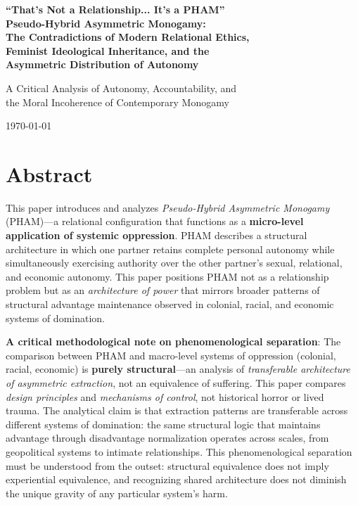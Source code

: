 \documentclass[12pt, letterpaper]{article}
\begin{document}
\begin{titlepage}
    \centering
    \vspace*{2in}
    {\LARGE\bfseries ``That's Not a Relationship... It's a PHAM''\\[0.5em]
    \large Pseudo-Hybrid Asymmetric Monogamy:\\[0.3em]
    The Contradictions of Modern Relational Ethics,\\[0.3em]
    Feminist Ideological Inheritance, and the\\[0.3em]
    Asymmetric Distribution of Autonomy\par}
    \vspace{1.5in}
    {\Large A Critical Analysis of Autonomy, Accountability, and\\[0.3em]
    the Moral Incoherence of Contemporary Monogamy\par}
    \vspace{2in}
    {\large\today\par}
    \vfill
\end{titlepage}

\newpage
\section*{Abstract}

This paper introduces and analyzes \textit{Pseudo-Hybrid Asymmetric Monogamy} (PHAM)---a relational configuration that functions as a \textbf{micro-level application of systemic oppression}. PHAM describes a structural architecture in which one partner retains complete personal autonomy while simultaneously exercising authority over the other partner's sexual, relational, and economic autonomy. This paper positions PHAM not as a relationship problem but as an \textit{architecture of power} that mirrors broader patterns of structural advantage maintenance observed in colonial, racial, and economic systems of domination.

\textbf{A critical methodological note on phenomenological separation}: The comparison between PHAM and macro-level systems of oppression (colonial, racial, economic) is \textbf{purely structural}---an analysis of \textit{transferable architecture of asymmetric extraction}, not an equivalence of suffering. This paper compares \textit{design principles} and \textit{mechanisms of control}, not historical horror or lived trauma. The analytical claim is that extraction patterns are transferable across different systems of domination: the same structural logic that maintains advantage through disadvantage normalization operates across scales, from geopolitical systems to intimate relationships. This phenomenological separation must be understood from the outset: structural equivalence does not imply experiential equivalence, and recognizing shared architecture does not diminish the unique gravity of any particular system's harm.
\end{document}
